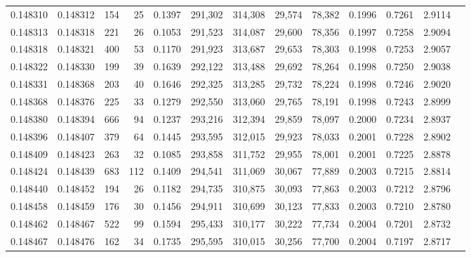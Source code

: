 \begin{tabular}{rrrrrrrrrrrrr}
0.148310 & 0.148312 &   154 &  25 &                                     0.1397 & 291,302 & 314,308 &  29,574 &  78,382 & 0.1996 & 0.7261 & 2.9114 \\
0.148313 & 0.148318 &   221 &  26 &                                     0.1053 & 291,523 & 314,087 &  29,600 &  78,356 & 0.1997 & 0.7258 & 2.9094 \\
0.148318 & 0.148321 &   400 &  53 &                                     0.1170 & 291,923 & 313,687 &  29,653 &  78,303 & 0.1998 & 0.7253 & 2.9057 \\
0.148322 & 0.148330 &   199 &  39 &                                     0.1639 & 292,122 & 313,488 &  29,692 &  78,264 & 0.1998 & 0.7250 & 2.9038 \\
0.148331 & 0.148368 &   203 &  40 &                                     0.1646 & 292,325 & 313,285 &  29,732 &  78,224 & 0.1998 & 0.7246 & 2.9020 \\
0.148368 & 0.148376 &   225 &  33 &                                     0.1279 & 292,550 & 313,060 &  29,765 &  78,191 & 0.1998 & 0.7243 & 2.8999 \\
0.148380 & 0.148394 &   666 &  94 &                                     0.1237 & 293,216 & 312,394 &  29,859 &  78,097 & 0.2000 & 0.7234 & 2.8937 \\
0.148396 & 0.148407 &   379 &  64 &                                     0.1445 & 293,595 & 312,015 &  29,923 &  78,033 & 0.2001 & 0.7228 & 2.8902 \\
0.148409 & 0.148423 &   263 &  32 &                                     0.1085 & 293,858 & 311,752 &  29,955 &  78,001 & 0.2001 & 0.7225 & 2.8878 \\
0.148424 & 0.148439 &   683 & 112 &                                     0.1409 & 294,541 & 311,069 &  30,067 &  77,889 & 0.2003 & 0.7215 & 2.8814 \\
0.148440 & 0.148452 &   194 &  26 &                                     0.1182 & 294,735 & 310,875 &  30,093 &  77,863 & 0.2003 & 0.7212 & 2.8796 \\
0.148458 & 0.148459 &   176 &  30 &                                     0.1456 & 294,911 & 310,699 &  30,123 &  77,833 & 0.2003 & 0.7210 & 2.8780 \\
0.148462 & 0.148467 &   522 &  99 &                                     0.1594 & 295,433 & 310,177 &  30,222 &  77,734 & 0.2004 & 0.7201 & 2.8732 \\
0.148467 & 0.148476 &   162 &  34 &                                     0.1735 & 295,595 & 310,015 &  30,256 &  77,700 & 0.2004 & 0.7197 & 2.8717 \\

\end{tabular}
